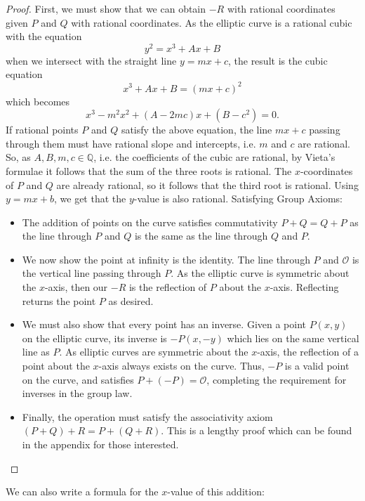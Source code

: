 \documentclass{article}
\theoremstyle{definition}
\theoremstyle{definition}
\theoremstyle{definition}
\begin{document}
\begin{proof}
    First, we must show that we can obtain $-R$ with rational coordinates given $P$ and $Q$ with rational coordinates. As the elliptic curve is a rational cubic with the equation $$y^2=x^3+Ax+B$$ when we intersect with the straight line $y=mx+c$, the result is the cubic equation $$x^3+Ax+B=(mx+c)^2$$ which becomes $$x^3 - m^2x^2 + (A - 2mc)x + (B - c^2)=0.$$ If rational points $P$ and $Q$ satisfy the above equation, the line $mx+c$ passing through them must have rational slope and intercepts, i.e. $m$ and $c$ are rational. So, as $A,B,m,c\in\mathbb{Q}$, i.e. the coefficients of the cubic are rational, by Vieta's formulae it follows that the sum of the three roots is rational. The $x$-coordinates of $P$ and $Q$ are already rational, so it follows that the third root is rational. Using $y=mx+b$, we get that the $y$-value is also rational.
    \newline\newline
    Satisfying Group Axioms:
    \begin{itemize}
        \item The addition of points on the curve satisfies commutativity $P+Q=Q+P$ as the line through $P$ and $Q$ is the same as the line through $Q$ and $P$. 
        \item We now show the point at infinity is the identity. The line through $P$ and $\mathcal{O}$ is the vertical line passing through $P$. As the elliptic curve is symmetric about the $x$-axis, then our $-R$ is the reflection of $P$ about the $x$-axis. Reflecting returns the point $P$ as desired. 
        \item We must also show that every point has an inverse. Given a point $P(x, y)$ on the elliptic curve, its inverse is $-P(x, -y)$ which lies on the same vertical line as $P$. As elliptic curves are symmetric about the $x$-axis, the reflection of a point about the $x$-axis always exists on the curve. Thus, $-P$ is a valid point on the curve, and satisfies $P+(-P)=\mathcal{O}$, completing the requirement for inverses in the group law. 
        \item Finally, the operation must satisfy the associativity axiom $(P+Q)+R=P+(Q+R)$. This is a lengthy proof which can be found in the appendix for those interested. 
 \end{itemize}
\end{proof}
We can also write a formula for the $x$-value of this addition:
\end{document}
